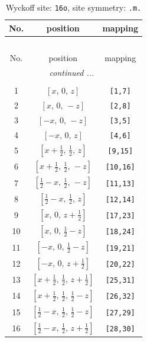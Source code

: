 \documentclass[fleqn,8pt]{jsarticle}
\begin{document}
\renewcommand{\arraystretch}{1.2}
\begin{longtable}{ccc}
\caption{Wyckoff site: {\tt 16o}, site symmetry: {\tt .m.}}
 \\
 \hline \hline
No. & position & mapping \\ \hline \endfirsthead

\multicolumn{2}{l}{\tablename\ \thetable{}} \\
 \hline \hline
No. & position & mapping \\ \hline \endhead

 \hline \hline
\multicolumn{2}{r}{\footnotesize\it continued ...} \\ \endfoot

 \hline \hline
\multicolumn{2}{r}{} \\ \endlastfoot

1 & $\left[ x,\, 0,\, z \right]$ & {\tt [1,7]} \\ \hline
2 & $\left[ x,\, 0,\, - z \right]$ & {\tt [2,8]} \\ \hline
3 & $\left[ - x,\, 0,\, - z \right]$ & {\tt [3,5]} \\ \hline
4 & $\left[ - x,\, 0,\, z \right]$ & {\tt [4,6]} \\ \hline
5 & $\left[ x + \frac{1}{2},\, \frac{1}{2},\, z \right]$ & {\tt [9,15]} \\ \hline
6 & $\left[ x + \frac{1}{2},\, \frac{1}{2},\, - z \right]$ & {\tt [10,16]} \\ \hline
7 & $\left[ \frac{1}{2} - x,\, \frac{1}{2},\, - z \right]$ & {\tt [11,13]} \\ \hline
8 & $\left[ \frac{1}{2} - x,\, \frac{1}{2},\, z \right]$ & {\tt [12,14]} \\ \hline
9 & $\left[ x,\, 0,\, z + \frac{1}{2} \right]$ & {\tt [17,23]} \\ \hline
10 & $\left[ x,\, 0,\, \frac{1}{2} - z \right]$ & {\tt [18,24]} \\ \hline
11 & $\left[ - x,\, 0,\, \frac{1}{2} - z \right]$ & {\tt [19,21]} \\ \hline
12 & $\left[ - x,\, 0,\, z + \frac{1}{2} \right]$ & {\tt [20,22]} \\ \hline
13 & $\left[ x + \frac{1}{2},\, \frac{1}{2},\, z + \frac{1}{2} \right]$ & {\tt [25,31]} \\ \hline
14 & $\left[ x + \frac{1}{2},\, \frac{1}{2},\, \frac{1}{2} - z \right]$ & {\tt [26,32]} \\ \hline
15 & $\left[ \frac{1}{2} - x,\, \frac{1}{2},\, \frac{1}{2} - z \right]$ & {\tt [27,29]} \\ \hline
16 & $\left[ \frac{1}{2} - x,\, \frac{1}{2},\, z + \frac{1}{2} \right]$ & {\tt [28,30]} \\
\end{longtable}
\end{document}
